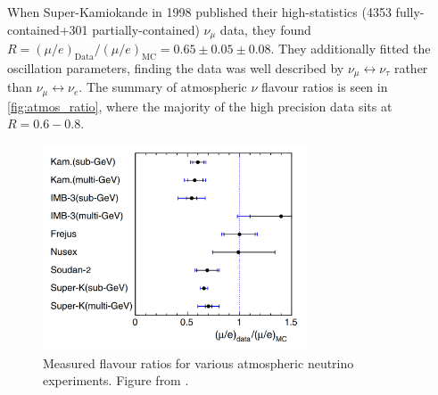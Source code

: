When Super-Kamiokande in 1998 published\cite{sk_disc} their high-statistics (4353 fully-contained+301 partially-contained) $\nu_\mu$ data, they found $R=\left( \mu/e \right)_\text{Data}/\left( \mu/e \right)_\text{MC} =0.65\pm0.05\pm0.08$. They additionally fitted the oscillation parameters, finding the data was well described by $\nu_\mu \leftrightarrow \nu_\tau$ rather than $\nu_\mu \leftrightarrow \nu_e$. The summary of atmospheric $\nu$ flavour ratios is seen in \autoref{fig:atmos_ratio}, where the majority of the high precision data sits at $R=0.6-0.8$.
\begin{figure}[h]
	\includegraphics[width=0.7\textwidth, trim={0mm 0mm 0mm 0mm}, clip,page=1]{figures/theory/flavour_ratio}
	\caption{Measured flavour ratios for various atmospheric neutrino experiments. Figure from \cite{kajita_summary}.}
	\label{fig:atmos_ratio}
\end{figure}

